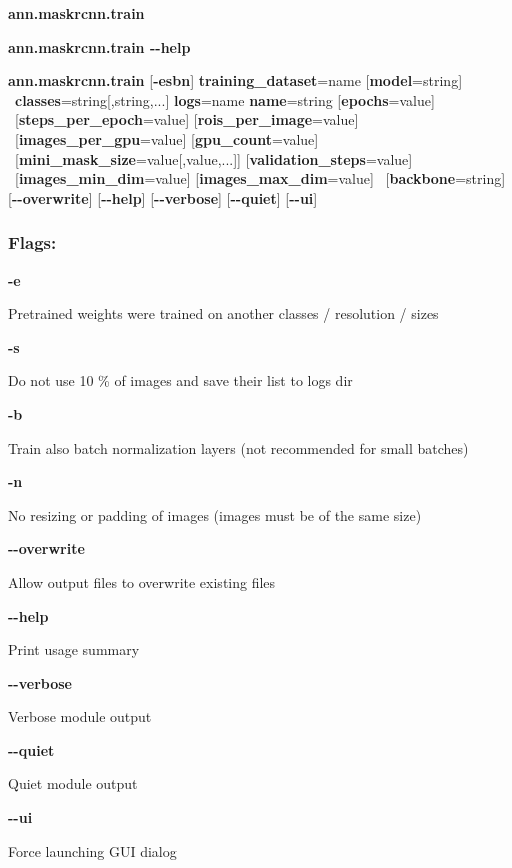\begin{flushleft}
\textbf{ann.maskrcnn.train} 

\textbf{ann.maskrcnn.train -{}-help}

\textbf{ann.maskrcnn.train} [\textbf{-esbn}] \textbf{training\_dataset}=name [\textbf{model}=string] \tab\ \textbf{classes}=string[,string,...] \textbf{logs}=name \textbf{name}=string [\textbf{epochs}=value] \tab\ [\textbf{steps\_per\_epoch}=value] [\textbf{rois\_per\_image}=value] \tab\ [\textbf{images\_per\_gpu}=value] [\textbf{gpu\_count}=value] \tab\ [\textbf{mini\_mask\_size}=value[,value,...]] [\textbf{validation\_steps}=value] \tab\ [\textbf{images\_min\_dim}=value] [\textbf{images\_max\_dim}=value] \tab\ [\textbf{backbone}=string] [\textbf{-{}-overwrite}] [\textbf{-{}-help}] [\textbf{-{}-verbose}] [\textbf{-{}-quiet}] [\textbf{-{}-ui}]
\end{flushleft}

\subsubsection*{Flags:}
\begin{flushleft}
  \textbf{-e}
  
  \tab Pretrained weights were trained on another classes / resolution / sizes
  
  \textbf{-s}
  
  \tab Do not use 10 \% of images and save their list to logs dir
  
  \textbf{-b}
  
  \tab Train also batch normalization layers (not recommended for small batches)

  \textbf{-n}
  
  \tab No resizing or padding of images (images must be of the same size)
  
  \textbf{-{}-overwrite}
  
  \tab Allow output files to overwrite existing files
  
  \textbf{-{}-help}
  
  \tab Print usage summary
  
  \textbf{-{}-verbose}
  
  \tab Verbose module output
  
  \textbf{-{}-quiet}
  
  \tab Quiet module output
  
  \textbf{-{}-ui}
  
  \tab Force launching GUI dialog
\end{flushleft}


